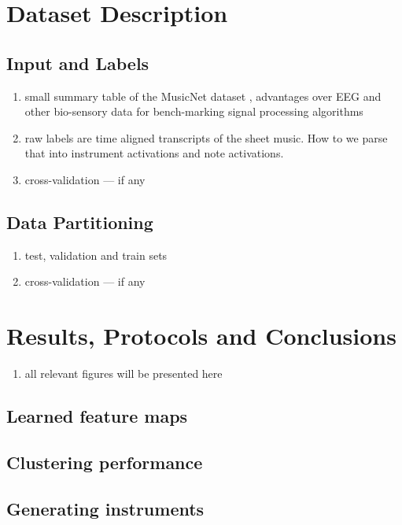 \documentclass{article}[12pt]
\numberwithin{equation}{section}
\begin{document}
\section{Dataset Description}

\subsection{Input and Labels}
\begin{enumerate}
	\item small summary table of the MusicNet dataset \cite{Thickstun2016}, advantages
	over EEG and other bio-sensory data for bench-marking signal processing algorithms
	\item raw labels are time aligned transcripts of the sheet music. How to we
	parse that into instrument activations and note activations.
	\item cross-validation --- if any
\end{enumerate}

\subsection{Data Partitioning}
\begin{enumerate}
	\item test, validation and train sets
	\item cross-validation --- if any
\end{enumerate}

\section{Results, Protocols and Conclusions}
\begin{enumerate}
	\item all relevant figures will be presented here
\end{enumerate}
\subsection{Learned feature maps}

\subsection{Clustering performance}

\subsection{Generating instruments}



\end{document}
